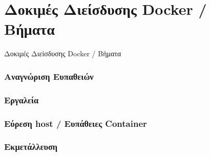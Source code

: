 \chapter{Δοκιμές Διείσδυσης \textlatin{Docker} / Βήματα}
\label{dockerPenTesting}

Δοκιμές Διείσδυσης \textlatin{Docker} / Βήματα

\subsection{Αναγνώριση Ευπαθειών}
\subsection{Εργαλεία}
\subsection{Εύρεση \textlatin{host} / Ευπάθειες \textlatin{Container}}
\subsection{Εκμετάλλευση}
